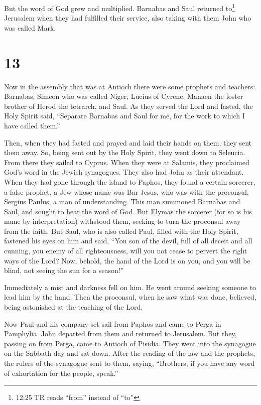 But the word of God grew and multiplied. 
Barnabas and Saul returned to\footnote{12:25 TR reads ``from'' instead
  of ``to''} Jerusalem when they had fulfilled their service, also
taking with them John who was called Mark.

\hypertarget{section-12}{%
\section{13}\label{section-12}}

 Now in the assembly that was at Antioch there were some
prophets and teachers: Barnabas, Simeon who was called Niger, Lucius of
Cyrene, Manaen the foster brother of Herod the tetrarch, and Saul.
 As they served the Lord and fasted, the Holy Spirit said,
``Separate Barnabas and Saul for me, for the work to which I have called
them.''

 Then, when they had fasted and prayed and laid their hands
on them, they sent them away.  So, being sent out by the
Holy Spirit, they went down to Seleucia. From there they sailed to
Cyprus.  When they were at Salamis, they proclaimed God's
word in the Jewish synagogues. They also had John as their attendant.
 When they had gone through the island to Paphos, they found
a certain sorcerer, a false prophet, a Jew whose name was Bar Jesus,
 who was with the proconsul, Sergius Paulus, a man of
understanding. This man summoned Barnabas and Saul, and sought to hear
the word of God.  But Elymas the sorcerer (for so is his
name by interpretation) withstood them, seeking to turn the proconsul
away from the faith.  But Saul, who is also called Paul,
filled with the Holy Spirit, fastened his eyes on him  and
said, ``You son of the devil, full of all deceit and all cunning, you
enemy of all righteousness, will you not cease to pervert the right ways
of the Lord?  Now, behold, the hand of the Lord is on you,
and you will be blind, not seeing the sun for a season!''

Immediately a mist and darkness fell on him. He went around seeking
someone to lead him by the hand.  Then the proconsul, when
he saw what was done, believed, being astonished at the teaching of the
Lord.

 Now Paul and his company set sail from Paphos and came to
Perga in Pamphylia. John departed from them and returned to Jerusalem.
 But they, passing on from Perga, came to Antioch of
Pisidia. They went into the synagogue on the Sabbath day and sat down.
 After the reading of the law and the prophets, the rulers
of the synagogue sent to them, saying, ``Brothers, if you have any word
of exhortation for the people, speak.''

